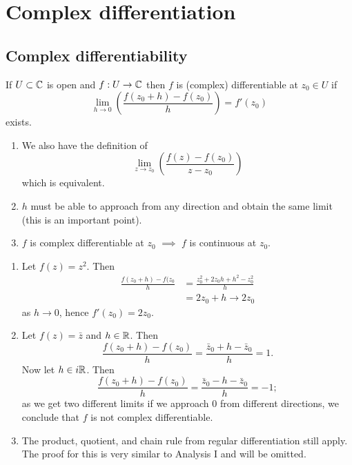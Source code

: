 \chapter{Complex differentiation}
\section{Complex differentiability}

\begin{definition}
    If $U \subset \mathbb{C}$ is open and $f: U \to \mathbb{C}$ then $f$ is (complex) differentiable at $z_0 \in U$ if
    \[ \lim_{h \to 0} \left( \frac{f(z_0 + h) - f(z_0)}{h} \right) = f'(z_0) \]
    exists.
\end{definition}

\begin{remark}
    \begin{enumerate}
        \item We also have the definition of
            \[ \lim_{z \to z_0} \left(\frac{f(z) - f(z_0)}{z - z_0}\right) \]
            which is equivalent.

        \item $h$ must be able to approach from any direction and obtain the same limit (this is an important point).

        \item $f$ is complex differentiable at $z_0$ $\implies$ $f$ is continuous at $z_0$.
    \end{enumerate}
\end{remark}

\begin{example}
    \begin{enumerate}
        \item Let $f(z) = z^2$. Then
            \begin{align*}
                \frac{f(z_0 + h) - f(z_0}{h} &= \frac{z_0^2 + 2z_0h + h^2 - z_0^2}{h} \\
                                             &= 2z_0 + h \to 2z_0
            \end{align*}
            as $h \to 0$, hence $f'(z_0) = 2z_0$.

        \item Let $f(z) = \bar z$ and $h \in \mathbb{R}$. Then
            \[ \frac{f(z_0 + h) - f(z_0)}{h} = \frac{\bar z_0 + h - \bar z_0}{h} = 1. \]
            Now let $h \in i\mathbb{R}$. Then
            \[ \frac{f(z_0 + h) - f(z_0)}{h} = \frac{\bar z_0 - h - \bar z_0}{h} = -1; \]
            as we get two different limits if we approach $0$ from different directions, we conclude that $f$ is not complex differentiable.
        \item The product, quotient, and chain rule from regular differentiation still apply. The proof for this is very similar to Analysis I and will be omitted.
    \end{enumerate}
\end{example}

